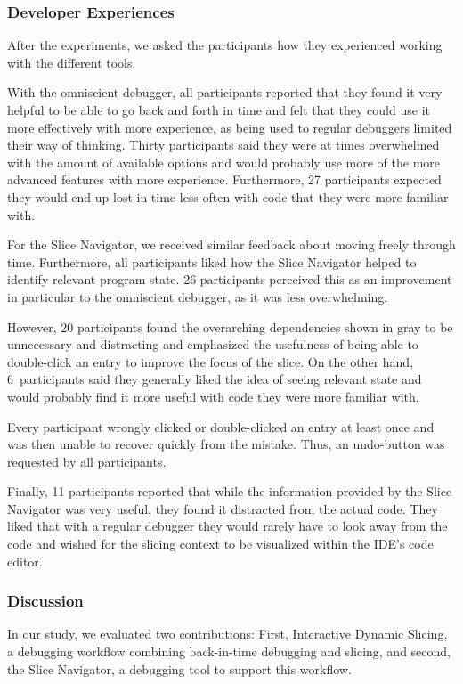 \subsubsection{Developer Experiences}

After the experiments, we asked the participants how they experienced working with the different tools.

With the omniscient debugger, all participants reported that they found it very helpful to be able to go back and forth in time and felt that they could use it more effectively with more experience, as being used to regular debuggers limited their way of thinking.
Thirty participants said they were at times overwhelmed with the amount of available options and would probably use more of the more advanced features with more experience.
Furthermore, 27 participants expected they would end up lost in time less often with code that they were more familiar with.

For the Slice Navigator, we received similar feedback about moving freely through time.
Furthermore, all participants liked how the Slice Navigator helped to identify relevant program state.
26 participants perceived this as an improvement in particular to the omniscient debugger, as it was less overwhelming.

However, 20 participants found the overarching dependencies shown in gray to be unnecessary and distracting and emphasized the usefulness of being able to double-click an entry to improve the focus of the slice.
On the other hand, 6~participants said they generally liked the idea of seeing relevant state and would probably find it more useful with code they were more familiar with.

Every participant wrongly clicked or double-clicked an entry at least once and was then unable to recover quickly from the mistake.
Thus, an undo-button was requested by all participants.

Finally, 11 participants reported that while the information provided by the Slice Navigator was very useful, they found it distracted from the actual code.
They liked that with a regular debugger they would rarely have to look away from the code and wished for the slicing context to be visualized within the IDE's code editor.

\subsubsection{Discussion}

In our study, we evaluated two contributions: 
First, Interactive Dynamic Slicing, a debugging workflow combining back-in-time debugging and slicing, and second, the Slice Navigator, a debugging tool to support this workflow.

